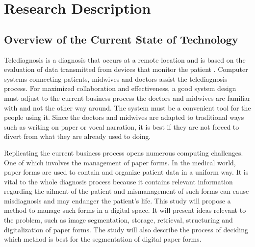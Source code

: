 %
%
%                 

\chapter{Research Description}
\label{sec:researchdesc}    %

\begin{comment}
Make sure to write a preamble for each chapter, i.e., a short description of what each chapter contains before 
the first section within the chapter.  The preamble can be written in about two to three sentences.
\end{comment}

\section{Overview of the Current State of Technology}
\label{sec:overview}

%
%

Telediagnosis is a diagnosis that occurs at a remote location and is based on the evaluation of data transmitted from devices that monitor the patient \cite{telediagnosis}. Computer systems connecting patients, midwives and doctors assist the telediagnosis process. For maximized collaboration and effectiveness, a good system design must adjust to the current business process the doctors and midwives are familiar with and not the other way around. The system must be a convenient tool for the people using it. Since the doctors and midwives are adapted to traditional ways such as writing on paper or vocal narration, it is best if they are not forced to divert from what they are already used to doing.

Replicating the current business process opens numerous computing challenges. One of which involves the management of paper forms. In the medical world, paper forms are used to contain and organize patient data in a uniform way. It is vital to the whole diagnosis process because it contains relevant information regarding the ailment of the patient and mismanagement of such forms can cause misdiagnosis and may endanger the patient’s life.  This study will propose a method to manage such forms in a digital space. It will present ideas relevant to the problem, such as image segmentation, storage, retrieval, structuring and digitalization of paper forms. The study will also describe the process of deciding which method is best for the segmentation of digital paper forms.


